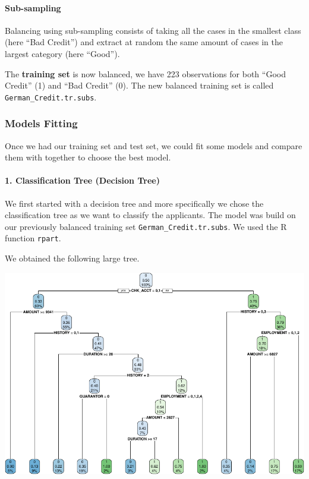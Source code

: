 \documentclass[
]{article}
\begin{document}
\hypertarget{sub-sampling}{%
\paragraph{Sub-sampling}\label{sub-sampling}}

Balancing using sub-sampling consists of taking all the cases in the
smallest class (here ``Bad Credit'') and extract at random the same
amount of cases in the largest category (here ``Good'').

The \textbf{training set} is now balanced, we have 223 observations for
both ``Good Credit'' (1) and ``Bad Credit'' (0). The new balanced
training set is called \texttt{German\_Credit.tr.subs}.

\hypertarget{models-fitting}{%
\subsubsection{Models Fitting}\label{models-fitting}}

Once we had our training set and test set, we could fit some models and
compare them with together to choose the best model.

\hypertarget{classification-tree-decision-tree}{%
\paragraph{1. Classification Tree (Decision
Tree)}\label{classification-tree-decision-tree}}

We first started with a decision tree and more specifically we chose the
classification tree as we want to classify the applicants. The model was
build on our previously balanced training set
\texttt{German\_Credit.tr.subs}. We used the R function \texttt{rpart}.

We obtained the following large tree.

\begin{center}\includegraphics{report_files/figure-latex/unnamed-chunk-28-1} \end{center}
\end{document}
